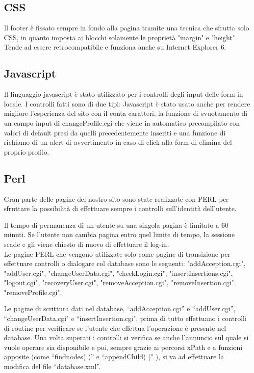 \documentclass[12pt]{article}
\begin{document}
	\subsection{CSS}
	
	Il footer è fissato sempre in fondo alla pagina tramite una tecnica che sfrutta solo CSS, in quanto imposta ai blocchi solamente le proprietà "margin" e "height". \\
	Tende ad essere retrocompatibile e funziona anche su Internet Explorer 6.\\

	
	\subsection{Javascript}
	
	Il linguaggio javascript è stato utilizzato per i controlli degli input delle form in locale.
	I controlli fatti sono di due tipi: 
	Javascript è stato usato anche per rendere migliore l'esperienza del sito con il conta caratteri, la funzione di svuotamento di un campo input di changeProfile.cgi che viene in automatico precompilato con valori di default presi da quelli precedentemente inseriti e una funzione di richiamo di un alert di avvertimento in caso di click alla form di elimina del proprio profilo.
	
	\subsection{Perl}
	
	Gran parte delle pagine del nostro sito sono state realizzate con PERL per sfruttare la possibilità di effettuare sempre i controlli sull’identità dell’utente.
	
	Il tempo di permanenza di un utente su una singola pagina è limitato a 60 minuti. Se l’utente non cambia pagina entro quel limite di tempo, la sessione scade e gli viene chiesto di nuovo di effettuare il log-in. \\	
	Le pagine PERL che vengono utilizzate solo come pagine di transizione per effettuare controlli o dialogare col database sono le seguenti:	
	"addAcception.cgi", "addUser.cgi", "changeUserData.cgi", "checkLogin.cgi", "insertInsertions.cgi", "logout.cgi", "recoveryUser.cgi", "removeAcception.cgi", "removeInsertion.cgi", "removeProfile.cgi".
	
Le pagine di scrittura dati nel database, “addAcception.cgi” e “addUser.cgi”, “changeUserData.cgi" e “insertInsertion.cgi", prima di tutto effettuano i controlli di routine per verificare se l’utente che effettua l’operazione è presente nel database. Una volta superati i controlli si verifica se anche l’annuncio sul quale si vuole operare sia disponibile e poi, sempre grazie ai percorsi xPath e a funzioni apposite (come “findnodes( )” e “appendChild( )" ), si va ad effettuare la modifica del file “database.xml”.
\end{document}
